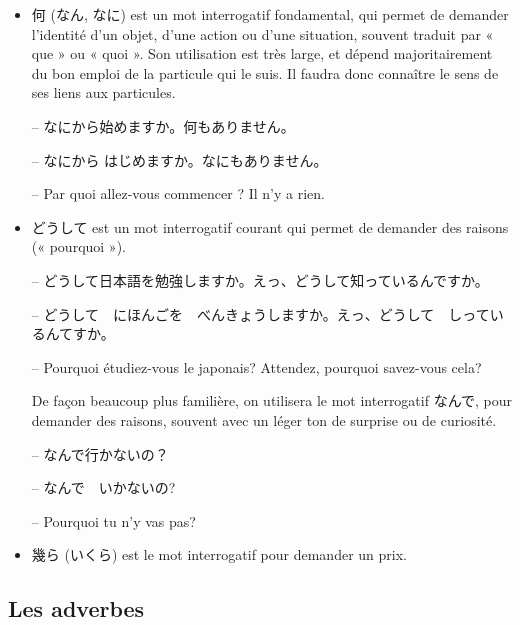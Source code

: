\begin{itemize}
        \item 何 (なん, なに) est un mot interrogatif fondamental, qui permet de demander l'identité d'un objet, d'une action ou d'une situation, souvent traduit par « que » ou « quoi ». Son utilisation est très large, et dépend majoritairement du bon emploi de la particule qui le suis. Il faudra donc connaître le sens de ses liens aux particules.
        
        \begin{tcolorbox}
            -- なにから始めますか。何もありません。

            -- なにから はじめますか。なにもありません。

            -- Par quoi allez-vous commencer ? Il n'y a rien.
        \end{tcolorbox}

        \item どうして est un mot interrogatif courant qui permet de demander des raisons (« pourquoi »).
        
        \begin{tcolorbox}
            -- どうして日本語を勉強しますか。えっ、どうして知っているんですか。

            -- どうして　にほんごを　べんきょうしますか。えっ、どうして　しっているんてすか。

            -- Pourquoi étudiez-vous le japonais? Attendez, pourquoi savez-vous cela?
        \end{tcolorbox}

        De façon beaucoup plus familière, on utilisera le mot interrogatif なんで, pour demander des raisons, souvent avec un léger ton de surprise ou de curiosité.

        \begin{tcolorbox}
            -- なんで行かないの？

            -- なんで　いかないの?

            -- Pourquoi tu n'y vas pas?
        \end{tcolorbox}

        \item 幾ら (いくら) est le mot interrogatif pour demander un prix.
    \end{itemize}


    \subsection{Les adverbes}

